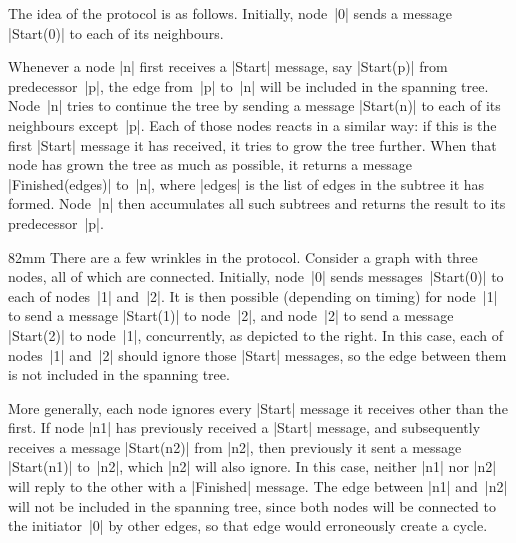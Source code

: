 The idea of the protocol is as follows.  Initially, node~|0| sends a message
|Start(0)| to each of its neighbours.  

Whenever a node |n| first receives a |Start| message, say |Start(p)| from
predecessor~|p|, the edge from~|p| to~|n| will be included in the spanning
tree.  Node~|n| tries to continue the tree by sending a message |Start(n)| to
each of its neighbours except~|p|.  Each of those nodes reacts in a similar
way: if this is the first |Start| message it has received, it tries to grow
the tree further.  When that node has grown the tree as much as possible, it
returns a message |Finished(edges)| to~|n|, where |edges| is the list of edges
in the subtree it has formed.  Node~|n| then accumulates all such subtrees and
returns the result to its predecessor~|p|.

\smallskip

\begin{myminipage}{82mm}
There are a few wrinkles in the protocol.  Consider a graph with three nodes,
all of which are connected.  Initially, node~|0| sends messages~|Start(0)| to
each of nodes~|1| and~|2|.  It is then possible (depending on timing) for
node~|1| to send a message |Start(1)| to node~|2|, and node~|2| to send a
message |Start(2)| to node~|1|, concurrently, as depicted to the right.  In
this case, each of nodes~|1| and~|2| should ignore those |Start| messages, so
the edge between them is not included in the spanning tree.
\end{myminipage}
%
\hfill
%
\begin{minipage}{50mm}
\def\labelSize{\footnotesize}
%
\end{minipage}

\smallskip

More generally, each node ignores every |Start| message it receives other than
the first.  
If node |n1| has previously received a |Start| message, and subsequently
receives a message |Start(n2)| from |n2|, then previously it sent a message
|Start(n1)| to~|n2|, which |n2| will also ignore.  In this case, neither |n1|
nor |n2| will reply to the other with a |Finished| message.  The edge between
|n1| and~|n2| will not be included in the spanning tree, since both nodes will
be connected to the initiator~|0| by other edges, so that edge would
erroneously create a cycle.

